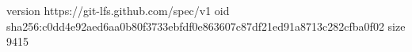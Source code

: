 version https://git-lfs.github.com/spec/v1
oid sha256:c0dd4e92aed6aa0b80f3733ebfdf0e863607c87df21ed91a8713c282cfba0f02
size 9415

